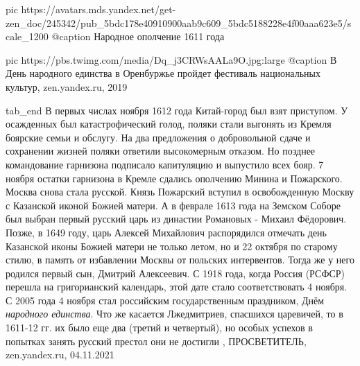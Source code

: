      pic https://avatars.mds.yandex.net/get-zen_doc/245342/pub_5bdc178e40910900aab9c609_5bdc5188228e4f00aaa623e5/scale_1200
		 @caption Народное ополчение 1611 года

		 pic https://pbs.twimg.com/media/Dq_j3CRWsAALa9O.jpg:large
		 @caption В День народного единства в Оренбуржье пройдет фестиваль национальных культур, zen.yandex.ru, 2019

  tab_end
\fi
В первых числах ноября 1612 года Китай-город был взят приступом. У осажденных
был катастрофический голод, поляки стали выгонять из Кремля боярские семьи и
обслугу. На два предложения о добровольной сдаче и сохранении жизней поляки
ответили высокомерным отказом. Но позднее командование гарнизона подписало
капитуляцию и выпустило всех бояр. 7 ноября остатки гарнизона в Кремле сдались
ополчению Минина и Пожарского. Москва снова стала русской. Князь Пожарский
вступил в освобожденную Москву с Казанской иконой Божией матери. А в феврале
1613 года на Земском Соборе был выбран первый русский царь из династии
Романовых - Михаил Фёдорович. Позже, в 1649 году, царь Алексей Михайлович
распорядился отмечать день Казанской иконы Божией матери не только летом, но и
22 октября по старому стилю, в память от избавлении Москвы от польских
интервентов. Тогда же у него родился первый сын, Дмитрий Алексеевич. С 1918
года, когда Россия (РСФСР) перешла на григорианский календарь, этой дате стало
соответствовать 4 ноября. С 2005 года 4 ноября стал российским государственным
праздником, Днём \emph{народного единства}.  Что же касается Лжедмитриев,
спасшихся царевичей, то в 1611-12 гг. их было еще два (третий и четвертый), но
особых успехов в попытках занять русский престол они не достигли
, 
ПРОСВЕТИТЕЛЬ, zen.yandex.ru, 04.11.2021
